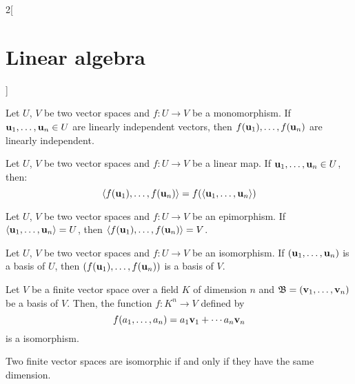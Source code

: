 \documentclass[../../../main.tex]{subfiles}
\begin{document}
\begin{multicols}{2}[\section{Linear algebra}]
\begin{definition}
  \end{definition}
  \begin{prop}
    Let $U$, $V$ be two vector spaces and $f:U\rightarrow V$ be a monomorphism. If $\boldsymbol{\mathrm{u}}_1,\ldots,\boldsymbol{\mathrm{u}}_n\in U$ are linearly independent vectors, then $f(\boldsymbol{\mathrm{u}}_1),\ldots,f(\boldsymbol{\mathrm{u}}_n)$  are linearly independent.
  \end{prop}
  \begin{lemma}
    Let $U$, $V$ be two vector spaces and $f:U\rightarrow V$ be a linear map. If $\boldsymbol{\mathrm{u}}_1,\ldots,\boldsymbol{\mathrm{u}}_n\in U$, then: $$\langle f(\boldsymbol{\mathrm{u}}_1),\ldots,f(\boldsymbol{\mathrm{u}}_n)\rangle=f(\langle\boldsymbol{\mathrm{u}}_1,\ldots,\boldsymbol{\mathrm{u}}_n\rangle)$$
  \end{lemma}
  \begin{corollary}
    Let $U$, $V$ be two vector spaces and $f:U\rightarrow V$ be an epimorphism. If $\langle\boldsymbol{\mathrm{u}}_1,\ldots,\boldsymbol{\mathrm{u}}_n\rangle= U$, then $\langle f(\boldsymbol{\mathrm{u}}_1),\ldots,f(\boldsymbol{\mathrm{u}}_n)\rangle=V$.
  \end{corollary}
  \begin{corollary}
    Let $U$, $V$ be two vector spaces and $f:U\rightarrow V$ be an isomorphism. If $(\boldsymbol{\mathrm{u}}_1,\ldots,\boldsymbol{\mathrm{u}}_n)$ is a basis of $U$, then $(f(\boldsymbol{\mathrm{u}}_1),\ldots,f(\boldsymbol{\mathrm{u}}_n))$ is a basis of $V$.
  \end{corollary}
  \begin{theorem}
    Let $V$ be a finite vector space over a field $K$ of dimension $n$ and $\mathfrak{B}=(\boldsymbol{\mathrm{v}}_1,\ldots,\boldsymbol{\mathrm{v}}_n)$ be a basis of $V$. Then, the function $f:K^n\rightarrow V$ defined by $$f(a_1,\ldots,a_n)=a_1\boldsymbol{\mathrm{v}}_1+\cdots a_n\boldsymbol{\mathrm{v}}_n$$ is a isomorphism.
  \end{theorem}
  \begin{corollary}
    Two finite vector spaces are isomorphic if and only if they have the same dimension.
  \end{corollary}

\end{multicols}
\end{document}
